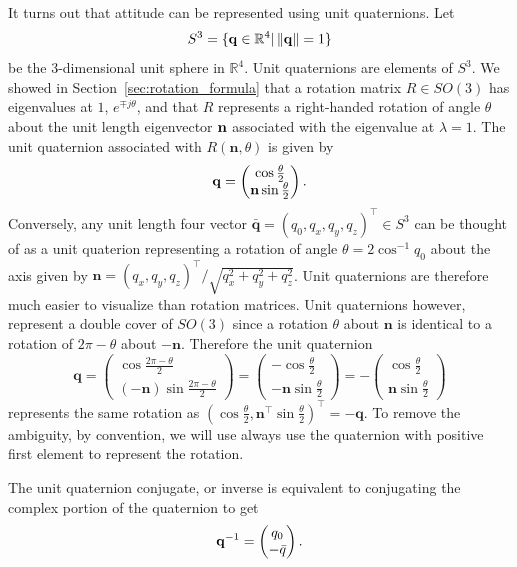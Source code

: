 It turns out that attitude can be represented using unit quaternions.  Let
\[
S^3 = \{ \mathbf{q}\in\mathbb{R}^4 | \left\|\mathbf{q}\right\|=1\}
\]
be the 3-dimensional unit sphere in $\mathbb{R}^4$.  Unit quaternions are elements of $S^3$.  
We showed in Section~\ref{sec:rotation_formula} that a rotation matrix $R\in SO(3)$ has eigenvalues at $1$, $e^{\mp j\theta}$, and that $R$ represents a right-handed rotation of angle $\theta$ about the unit length eigenvector $\mathbf{n}$ associated with the eigenvalue at $\lambda=1$.  The unit quaternion associated with $R(\mathbf{n},\theta)$ is given by
\[
\mathbf{q} = \begin{pmatrix} \cos\frac{\theta}{2} \\ \mathbf{n}\sin\frac{\theta}{2} \end{pmatrix}.
\]
Conversely, any unit length four vector $\bar{\mathbf{q}} = (q_0, q_x, q_y, q_z)^\top\in S^3$ can be thought of as a unit quaterion representing a rotation of angle $\theta = 2\cos^{-1} q_0$ about the axis given by $\mathbf{n} = (q_x, q_y, q_z)^\top/\sqrt{q_x^2+q_y^2+q_z^2}$.  Unit quaternions are therefore much easier to visualize than rotation matrices.  Unit quaternions however, represent a double cover of $SO(3)$ since a rotation $\theta$ about $\mathbf{n}$ is identical to a rotation of $2\pi-\theta$ about $-\mathbf{n}$.  Therefore the unit quaternion
\[
\mathbf{q} = \begin{pmatrix} \cos\frac{2\pi-\theta}{2} \\ (-\mathbf{n})\sin\frac{2\pi-\theta}{2}  \end{pmatrix} = \begin{pmatrix} -\cos\frac{\theta}{2} \\ - \mathbf{n}\sin\frac{\theta}{2} \end{pmatrix} = -\begin{pmatrix} \cos\frac{\theta}{2} \\ \mathbf{n}\sin\frac{\theta}{2} \end{pmatrix}
\]
represents the same rotation as $(\cos\frac{\theta}{2}, \mathbf{n}^\top \sin\frac{\theta}{2})^\top = -\mathbf{q}$.  To remove the ambiguity, by convention, we will use always use the quaternion with positive first element to represent the rotation.  

The unit quaternion conjugate, or inverse is equivalent to conjugating the complex portion of the quaternion to get
\[
\mathbf{q}^{-1}=\begin{pmatrix}q_0\\
-\bar{q}
\end{pmatrix}.
\]


